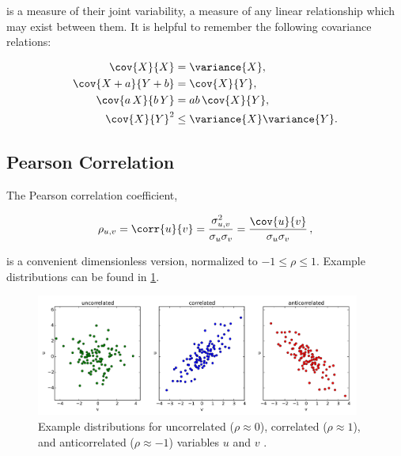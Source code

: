\noindent is a measure of their joint variability,
\ie a measure of any linear relationship which may exist between them.
It is helpful to remember the following covariance relations:

\begin{subequations}\label{eq:stats:covar_relations}
\begin{align}
\cov{X}{X} &= \variance{X}, \label{eq:stats:covar_relations:var} \\
\cov{X + a}{Y + b} &= \cov{X}{Y}, \label{eq:stats:covar_relations:add} \\
\cov{a\,X}{b\,Y} &= ab\,\cov{X}{Y}, \label{eq:stats:covar_relations:mult} \\
\cov{X}{Y}^{2} &\leq \variance{X}\variance{Y}. \label{eq:stats:covar_relations:inequality}
\end{align}
\end{subequations}

\subsection{Pearson Correlation}
\label{stats:corr_covar:pearson}

The Pearson correlation coefficient,

\begin{equation}\label{eq:stats:corr:pearson}
\rho_{u,v} = \corr{u}{v} = \frac{\sigma_{u,v}^{2}}{\sigma_{u}\sigma_{v}} = \frac{\cov{u}{v}}{\sigma_{u}\sigma_{v}}\,,
\end{equation}

\noindent is a convenient dimensionless version, normalized to $-1 \leq \rho \leq 1$.
Example distributions can be found in \cref{fig:stats:corr_ex:pearson}.

\begin{figure}
\centering
\includegraphics[width=0.95\textwidth]{figures/stats/corr_ex}
\caption{
Example distributions for
uncorrelated ($\rho \approx 0$),
correlated ($\rho \approx 1$),
and anticorrelated ($\rho \approx -1$)
variables $u$ and $v$ \cite{DougNotes}.
}
\label{fig:stats:corr_ex:pearson}
\end{figure}

